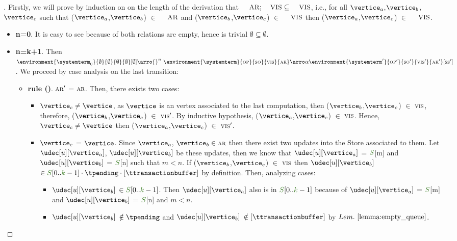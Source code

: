 \begin{proof}[]
Firstly, we will prove by induction on on the length of the derivation that $\textsc{\small{AR}};\textsc{\small{VIS}} \subseteq \textsc{\small{VIS}}$, i.e., for all $\vertice_a$,$\vertice_b$,$\vertice_c$ such that ($\vertice_a$,$\vertice_b$) $\in$ $\textsc{\small{AR}}$ and ($\vertice_b$,$\vertice_c$) $\in$ $\textsc{\small{VIS}}$ then ($\vertice_a$,$\vertice_c$) $\in$ $\textsc{\small{VIS}}$.

\begin{itemize}
   \item{\bf n=0}. It is easy to see because of both relations are empty, hence is trivial $\emptyset \subseteq \emptyset$.
   \item{\bf n=k+1}. Then $\environment{\systemterm_0}{\emptyset}{\emptyset}{\emptyset}{\emptyset}[\emptyset] \arro{} ^n\ \environment{\systemterm}{\op}{\so}{\vis}{\arb}\arroi{\alpha} \environment{\systemterm'}{\op'}{\so'}{\vis'}{\arb'}[\sse']$. We proceed by case analysis on the last transition:
	
	\begin{itemize}
        \item {\bf rule ()}. $\textsc{\scriptsize{AR}}'$ = $\textsc{\scriptsize{AR}}$.  Then, there exists two cases: 				
				\begin{itemize}
					\item $\vertice_c \neq \vertice$, as $\vertice$ is an vertex associated to the last computation, then ($\vertice_b$,$\vertice_c$) $\in$ $\textsc{\scriptsize{VIS}}$, therefore, ($\vertice_b$,$\vertice_c$) $\in$ $\textsc{\scriptsize{VIS}}'$. By inductive hypothesis, ($\vertice_a$,$\vertice_c$) $\in$ $\textsc{\scriptsize{VIS}}$. Hence, $\vertice_c \neq \vertice$ then ($\vertice_a$,$\vertice_c$) $\in$  $\textsc{\scriptsize{VIS}}'$.
					\item $\vertice_c$ = $\vertice$. Since $\vertice_a$, $\vertice_b \in \arb$ then there exist two updates into the Store associated to them. Let $\udec[u][\vertice_a]$, $\udec[u][\vertice_b]$ be these updates, then we know that $\udec[u][\vertice_a]$ = $\queuemessage$[m] and $\udec[u][\vertice_b]$ = $\queuemessage$[n] such that $m < n$. If ($\vertice_b$,$\vertice_c$) $\in$ $\textsc{\scriptsize{VIS}}$ then $\udec[u][\vertice_b]$ $\in \queuemessage[0..\tknown-1] \cdot \tpending \cdot [\ttransactionbuffer]$ by definition. Then, analyzing cases:
					\begin{itemize}
						\item $\udec[u][\vertice_b]$ $\in \queuemessage[0..\tknown-1]$. Then $\udec[u][\vertice_a]$ also is in $\queuemessage[0..\tknown-1]$ because of $\udec[u][\vertice_a]$ = $\queuemessage$[m] and $\udec[u][\vertice_b]$ = $\queuemessage$[n] and $m < n$.
						\item $\udec[u][\vertice_b]$ $\notin \tpending$ and $\udec[u][\vertice_b]$ $\notin [\ttransactionbuffer]$ by $\lemref{lemma:empty_queue}$.
					\end{itemize}
					

\end{itemize}
\end{itemize}
\end{itemize}
\end{proof}
